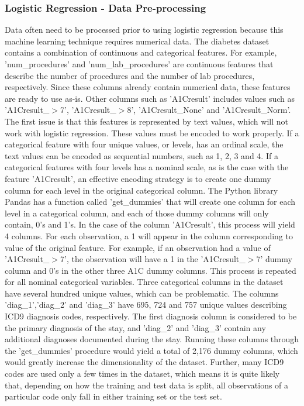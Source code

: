 \documentclass[sigconf]{acmart}
\begin{document}
\subsubsection{Logistic Regression - Data Pre-processing}

Data often need to be processed prior to using logistic regression because this machine learning technique requires numerical data. The diabetes dataset contains a combination of continuous and categorical features. For example, 'num\_procedures' and 'num\_lab\_procedures' are continuous features that describe the number of procedures and the number of lab procedures, respectively. Since these columns already contain numerical data, these features are ready to use as-is. Other columns such as 'A1Cresult' includes values such as 'A1Cresult\_$>$7', 'A1Cresult\_$>$8', 'A1Cresult\_None' and 'A1Cresult\_Norm'. The first issue is that this features is represented by text values, which will not work with logistic regression. These values must be encoded to work properly. If a categorical feature with four unique values, or levels, has an ordinal scale, the text values can be encoded as sequential numbers, such as 1, 2, 3 and 4. If a categorical features with four levels has a nominal scale, as is the case with the feature 'A1Cresult', an effective encoding strategy is to create one dummy column for each level in the original categorical column.
The Python library Pandas has a function called 'get\_dummies' that will create one column for each level in a categorical column, and each of those dummy columns will only contain, 0's and 1's. In the case of the column 'A1Cresult', this process will yield 4 columns. For each observation, a 1 will appear in the column corresponding to value of the original feature. For example, if an observation had a value of 'A1Cresult\_$>$7', the observation will have a 1 in the 'A1Cresult\_$>$7' dummy column and 0's in the other three A1C dummy columns. This process is repeated for all nominal categorical variables.
Three categorical columns in the dataset have several hundred unique values, which can be problematic. The columns 'diag\_1','diag\_2' and 'diag\_3' have 695, 724 and 757 unique values describing ICD9 diagnosis codes, respectively. The first diagnosis column is considered to be the primary diagnosis of the stay, and 'diag\_2' and 'diag\_3' contain any additional diagnoses documented during the stay. Running these columns through the 'get\_dummies' procedure would yield a total of 2,176 dummy columns, which would greatly increase the dimensionality of the dataset. Further, many ICD9 codes are used only a few times in the dataset, which means it is quite likely that, depending on how the training and test data is split, all observations of a particular code only fall in either training set or the test set.
\end{document}
